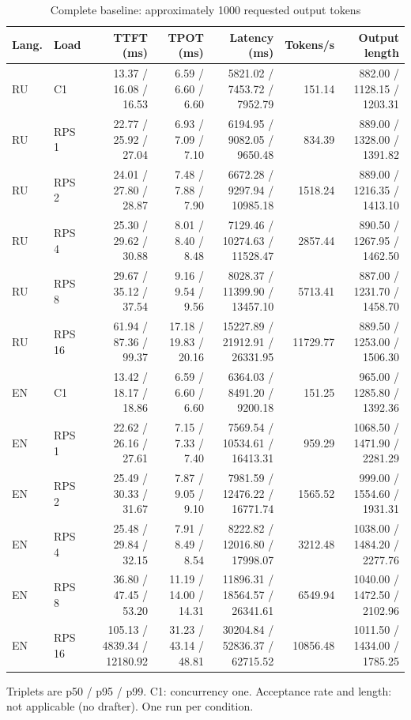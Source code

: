 \begin{table}[htbp]
\centering
\caption{Complete baseline: approximately 1000 requested output tokens}
\label{tab:full1000}
\begin{singlespace}
\fontsize{10.5}{13}\selectfont
\setlength{\tabcolsep}{4pt}
\renewcommand{\arraystretch}{1.2}
\begin{tabular}{@{}llrrrrr@{}}
\toprule
Lang. & Load & TTFT (ms) & TPOT (ms) & Latency (ms) & Tokens/s & Output length \\
\midrule
RU & C1 & 13.37 / 16.08 / 16.53 & 6.59 / 6.60 / 6.60 & 5821.02 / 7453.72 / 7952.79 & 151.14 & 882.00 / 1128.15 / 1203.31 \\
RU & RPS 1 & 22.77 / 25.92 / 27.04 & 6.93 / 7.09 / 7.10 & 6194.95 / 9082.05 / 9650.48 & 834.39 & 889.00 / 1328.00 / 1391.82 \\
RU & RPS 2 & 24.01 / 27.80 / 28.87 & 7.48 / 7.88 / 7.90 & 6672.28 / 9297.94 / 10985.18 & 1518.24 & 889.00 / 1216.35 / 1413.10 \\
RU & RPS 4 & 25.30 / 29.62 / 30.88 & 8.01 / 8.40 / 8.48 & 7129.46 / 10274.63 / 11528.47 & 2857.44 & 890.50 / 1267.95 / 1462.50 \\
RU & RPS 8 & 29.67 / 35.12 / 37.54 & 9.16 / 9.54 / 9.56 & 8028.37 / 11399.90 / 13457.10 & 5713.41 & 887.00 / 1231.70 / 1458.70 \\
RU & RPS 16 & 61.94 / 87.36 / 99.37 & 17.18 / 19.83 / 20.16 & 15227.89 / 21912.91 / 26331.95 & 11729.77 & 889.50 / 1253.00 / 1506.30 \\
EN & C1 & 13.42 / 18.17 / 18.86 & 6.59 / 6.60 / 6.60 & 6364.03 / 8491.20 / 9200.18 & 151.25 & 965.00 / 1285.80 / 1392.36 \\
EN & RPS 1 & 22.62 / 26.16 / 27.61 & 7.15 / 7.33 / 7.40 & 7569.54 / 10534.61 / 16413.31 & 959.29 & 1068.50 / 1471.90 / 2281.29 \\
EN & RPS 2 & 25.49 / 30.33 / 31.67 & 7.87 / 9.05 / 9.10 & 7981.59 / 12476.22 / 16771.74 & 1565.52 & 999.00 / 1554.60 / 1931.31 \\
EN & RPS 4 & 25.48 / 29.84 / 32.15 & 7.91 / 8.49 / 8.54 & 8222.82 / 12016.80 / 17998.07 & 3212.48 & 1038.00 / 1484.20 / 2277.76 \\
EN & RPS 8 & 36.80 / 47.45 / 53.20 & 11.19 / 14.00 / 14.31 & 11896.31 / 18564.57 / 26341.61 & 6549.94 & 1040.00 / 1472.50 / 2102.96 \\
EN & RPS 16 & 105.13 / 4839.34 / 12180.92 & 31.23 / 43.14 / 48.81 & 30204.84 / 52836.37 / 62715.52 & 10856.48 & 1011.50 / 1434.00 / 1785.25 \\
\bottomrule
\end{tabular}
\par\smallskip\raggedright Triplets are p50 / p95 / p99. C1: concurrency one. Acceptance rate and length: not applicable (no drafter). One run per condition.
\end{singlespace}
\end{table}
